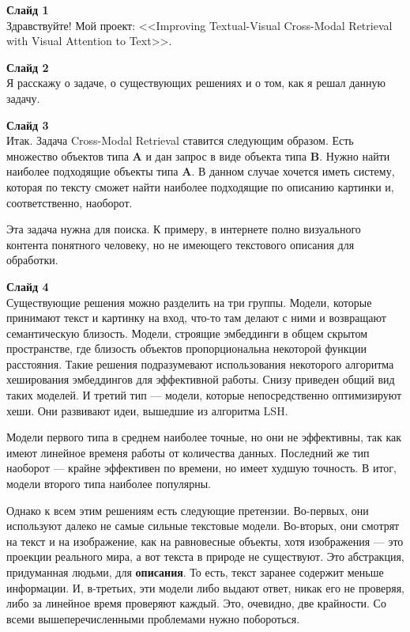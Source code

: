 \documentclass[12pt]{article}
\begin{document}
	
	\textbf{Слайд 1}\\
	Здравствуйте! Мой проект: <<Improving Textual-Visual Cross-Modal Retrieval with Visual Attention to Text>>.
	
	\textbf{Слайд 2}\\
	Я расскажу о задаче, о существующих решениях и о том, как я решал данную задачу.
	
	\textbf{Слайд 3}\\
	Итак. Задача Cross-Modal Retrieval ставится следующим образом. Есть множество объектов типа \textbf{A} и дан запрос в виде объекта типа \textbf{B}. Нужно найти наиболее подходящие объекты типа \textbf{A}. В данном случае хочется иметь систему, которая по тексту сможет найти наиболее подходящие по описанию картинки и, соответственно, наоборот.
	
	Эта задача нужна для поиска. К примеру, в интернете полно визуального контента понятного человеку, но не имеющего текстового описания для обработки.
	
	\textbf{Слайд 4}\\
	Существующие решения можно разделить на три группы. Модели, которые принимают текст и картинку на вход, что-то там делают с ними и возвращают семантическую близость. Модели, строящие эмбеддинги в общем скрытом пространстве, где близость объектов пропорциональна некоторой функции расстояния. Такие решения подразумевают использования некоторого алгоритма хеширования эмбеддингов для эффективной работы. Снизу приведен общий вид таких моделей. И третий тип --- модели, которые непосредственно оптимизируют хеши. Они развивают идеи, вышедшие из алгоритма LSH.
	
	Модели первого типа в среднем наиболее точные, но они не эффективны, так как имеют линейное временя работы от количества данных. Последний же тип наоборот --- крайне эффективен по времени, но имеет худшую точность. В итог, модели второго типа наиболее популярны.
	
	Однако к всем этим решениям есть следующие претензии. Во-первых, они используют далеко не самые сильные текстовые модели. Во-вторых, они смотрят на текст и на изображение, как на равновесные объекты, хотя изображения --- это проекции реального мира, а вот текста в природе не существуют. Это абстракция, придуманная людьми, для \textbf{описания}. То есть, текст заранее содержит меньше информации. И, в-третьих, эти модели либо выдают ответ, никак его не проверяя, либо за линейное время проверяют каждый. Это, очевидно, две крайности. Со всеми вышеперечисленными проблемами нужно побороться.
	
\end{document}
